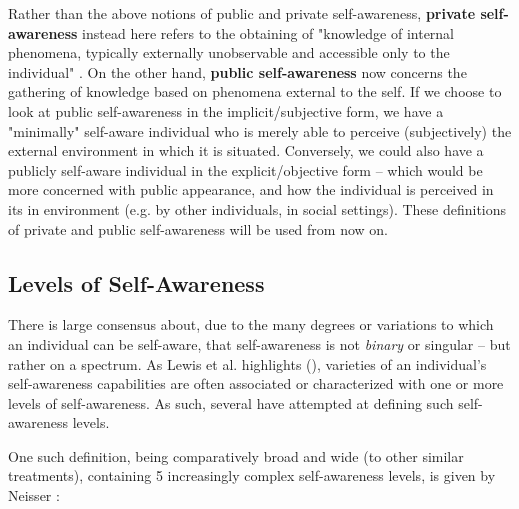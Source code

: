 	Rather than the above notions of public and private self-awareness, \textbf{private self-awareness} instead here refers to the obtaining of "knowledge of internal phenomena, typically externally unobservable and accessible only to the individual" \cite{sacs16_ch2}. On the other hand, \textbf{public self-awareness} now concerns the gathering of knowledge based on phenomena external to the self. If we choose to look at public self-awareness in the implicit/subjective form, we have a "minimally" self-aware individual who is merely able to perceive (subjectively) the external environment in which it is situated. Conversely, we could also have a publicly self-aware individual in the explicit/objective form -- which would be more concerned with public appearance, and how the individual is perceived in its in environment (e.g. by other individuals, in social settings). These definitions of private and public self-awareness will be used from now on.


	\subsection{Levels of Self-Awareness}

	There is large consensus about, due to the many degrees or variations to which an individual can be self-aware, that self-awareness is not \textit{binary} or singular -- but rather on a spectrum. As Lewis et al. highlights (\cite{sacs16_ch2, sacs17_ch3}), varieties of an individual's self-awareness capabilities are often associated or characterized with one or more levels of self-awareness. As such, several have attempted at defining such self-awareness levels.

	One such definition, being comparatively broad and wide (to other similar treatments), containing 5 increasingly complex self-awareness levels, is given by Neisser \cite{neisser284}:

